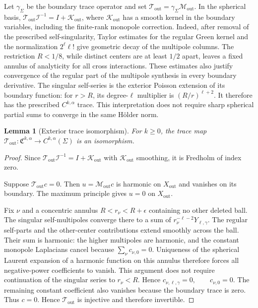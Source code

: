 \documentclass[11pt,a4paper,twoside]{article}
\numberwithin{equation}{section}
\newtheorem{lemma}[theorem]{Lemma}
\theoremstyle{definition}
\theoremstyle{remark}
\begin{document}
Let \(\gamma_\Sigma\) be the boundary trace operator and set
\(\mathcal T_{\mathrm{out}}=\gamma_\Sigma\mathcal M_{\mathrm{out}}\).
In the spherical basis,
\(\mathcal T_{\mathrm{out}}\mathcal I^{-1}=I+\mathcal K_{\mathrm{out}}\),
where \(\mathcal K_{\mathrm{out}}\) has a smooth kernel in the boundary
variables, including the finite-rank monopole correction. Indeed,
after removal of the prescribed self-singularity, Taylor estimates
for the regular Green kernel and the normalization \(2^\ell\ell!\)
give geometric decay of the multipole columns. The restriction
\(R<1/8\), while distinct centers are at least \(1/2\) apart, leaves
a fixed annulus of analyticity for all cross interactions. These
estimates also justify convergence of the regular part of the
multipole synthesis in every boundary derivative. The singular
self-series is the exterior Poisson extension of its boundary
function: for \(r>R\), its degree-\(\ell\) multiplier is
\((R/r)^{\ell+2}\). It therefore has the prescribed
\(C^{k,\alpha}\) trace. This interpretation does not require
sharp spherical partial sums to converge in the same H\"older norm.

\begin{lemma}[Exterior trace isomorphism]
\label{lem:outer-trace-isomorphism}
For \(k\ge0\), the trace map
\(\mathcal T_{\mathrm{out}}:\mathfrak C^{k,\alpha}
\to C^{k,\alpha}(\Sigma)\) is an isomorphism.
\end{lemma}

\begin{proof}
Since \(\mathcal T_{\mathrm{out}}\mathcal I^{-1}=I+\mathcal K_{\mathrm{out}}\) with \(\mathcal K_{\mathrm{out}}\) smoothing, it is Fredholm of index
zero.

Suppose \(\mathcal T_{\mathrm{out}}c=0.\) Then \(u=\mathcal M_{\mathrm{out}}c\) is harmonic on \(X_{\mathrm{out}}\) and vanishes on its boundary.
The maximum principle gives \(u=0\) on \(X_{\mathrm{out}}\).

Fix \(\nu\) and a concentric annulus \(R<r_\nu<R+\epsilon\)
containing no other deleted ball. The singular self-multipoles converge
there to a sum of \(r_\nu^{-\ell-2}Y_{\ell,\gamma}\). The regular
self-parts and the other-center contributions extend smoothly
across the ball. Their sum is harmonic: the higher multipoles are
harmonic, and the constant monopole Laplacians cancel because
\(\sum_\nu c_{\nu,0}=0\). Uniqueness of the spherical Laurent
expansion of a harmonic function on this annulus therefore forces
all negative-power coefficients to vanish. This argument does not
require continuation of the singular series to \(r_\nu<R\). Hence
\(c_{\nu,\ell,\gamma}=0, \qquad c_{\nu,0}=0.\) The remaining constant coefficient also vanishes because the boundary
trace is zero.  Thus \(c=0\).  Hence
\(\mathcal T_{\mathrm{out}}\) is injective and therefore invertible.
\end{proof}
\end{document}
